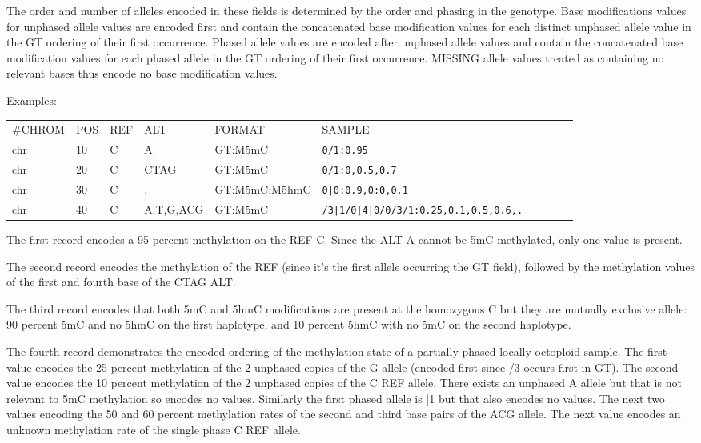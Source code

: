 \documentclass[8pt]{article}
\begin{document}
\begin{itemize}
  The order and number of alleles encoded in these fields is determined by the order and phasing in the genotype.
  Base modifications values for unphased allele values are encoded first and contain the concatenated base modification values for each distinct unphased allele value in the GT ordering of their first occurrence.
  Phased allele values are encoded after unphased allele values and contain the concatenated base modification values for each phased allele in the GT ordering of their first occurrence.
  MISSING allele values treated as containing no relevant bases thus encode no base modification values.
  
  Examples: 
  
  \vspace{0.5em}
  \begin{tabular}{ l l l l l l l l l l}
  	\#CHROM & POS & REF & ALT & FORMAT & SAMPLE\\
  	chr & $10$ & C & A         & GT:M5mC       & \tt{0/1:0.95}\\
  	chr & $20$ & C & CTAG      & GT:M5mC       & \tt{0/1:0,0.5,0.7}\\
  	chr & $30$ & C & .         & GT:M5mC:M5hmC & \tt{0|0:0.9,0:0,0.1}\\
  	chr & $40$ & C & A,T,G,ACG & GT:M5mC       & \tt{/3|1/0|4|0/0/3/1:0.25,0.1,0.5,0.6,.}\\
  \end{tabular}
  
  The first record encodes a 95 percent methylation on the REF C.
  Since the ALT A cannot be 5mC methylated, only one value is present.
  
  The second record encodes the methylation of the REF (since it's the first allele occurring the GT field), followed by the methylation values of the first and fourth base of the CTAG ALT.
  
  The third record encodes that both 5mC and 5hmC modifications are present at the homozygous C but they are mutually exclusive allele: 90 percent 5mC and no 5hmC on the first haplotype, and 10 percent 5hmC with no 5mC on the second haplotype.
  
  The fourth record demonstrates the encoded ordering of the methylation state of a partially phased locally-octoploid sample.
  The first value encodes the 25 percent methylation of the 2 unphased copies of the G allele (encoded first since /3 occurs first in GT).
  The second value encodes the 10 percent methylation of the 2 unphased copies of the C REF allele.
  There exists an unphased A allele but that is not relevant to 5mC methylation so encodes no values.
  Similarly the first phased allele is |1 but that also encodes no values.
  The next two values encoding the 50 and 60 percent methylation rates of the second and third base pairs of the ACG allele.
  The next value encodes an unknown methylation rate of the single phase C REF allele.
    

\end{itemize}
\end{document}
